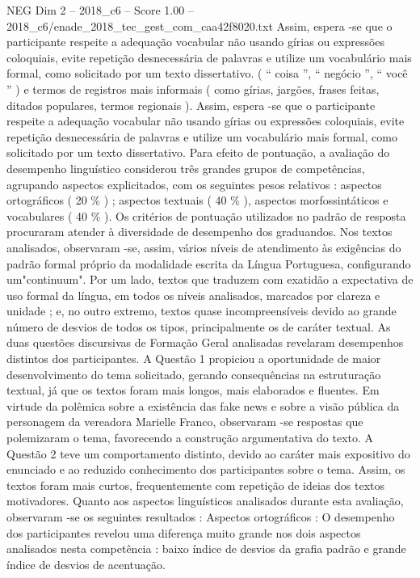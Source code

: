 \begin{textsample}{NEG Dim 2 – 2018\_c6 – Score 1.00 – 2018\_c6/enade\_2018\_tec\_gest\_com\_caa42f8020.txt}
Assim, espera -se que o participante respeite a adequação vocabular não usando gírias ou expressões coloquiais, evite repetição desnecessária de palavras e utilize um vocabulário mais formal, como solicitado por um texto dissertativo. ( “ coisa ”, “ negócio ”, “ você ” ) e termos de registros mais informais ( como gírias, jargões, frases feitas, ditados populares, termos regionais ).
Assim, espera -se que o participante respeite a adequação vocabular não usando gírias ou expressões coloquiais, evite repetição desnecessária de palavras e utilize um vocabulário mais formal, como solicitado por um texto dissertativo.
Para efeito de pontuação, a avaliação do desempenho linguístico considerou três grandes grupos de competências, agrupando aspectos explicitados, com os seguintes pesos relativos : aspectos ortográficos ( 20 \% ) ; aspectos textuais ( 40 \% ), aspectos morfossintáticos e vocabulares ( 40 \% ).
Os critérios de pontuação utilizados no padrão de resposta procuraram atender à diversidade de desempenho dos graduandos.
Nos textos analisados, observaram -se, assim, vários níveis de atendimento às exigências do padrão formal próprio da modalidade escrita da Língua Portuguesa, configurando um"continuum".
Por um lado, textos que traduzem com exatidão a expectativa de uso formal da língua, em todos os níveis analisados, marcados por clareza e unidade ; e, no outro extremo, textos quase incompreensíveis devido ao grande número de desvios de todos os tipos, principalmente os de caráter textual.
As duas questões discursivas de Formação Geral analisadas revelaram desempenhos distintos dos participantes.
A Questão 1 propiciou a oportunidade de maior desenvolvimento do tema solicitado, gerando consequências na estruturação textual, já que os textos foram mais longos, mais elaborados e fluentes.
Em virtude da polêmica sobre a existência das fake news e sobre a visão pública da personagem da vereadora Marielle Franco, observaram -se respostas que polemizaram o tema, favorecendo a construção argumentativa do texto.
A Questão 2 teve um comportamento distinto, devido ao caráter mais expositivo do enunciado e ao reduzido conhecimento dos participantes sobre o tema.
Assim, os textos foram mais curtos, frequentemente com repetição de ideias dos textos motivadores.
Quanto aos aspectos linguísticos analisados durante esta avaliação, observaram -se os seguintes resultados : Aspectos ortográficos : O desempenho dos participantes revelou uma diferença muito grande nos dois aspectos analisados nesta competência : baixo índice de desvios da grafia padrão e grande índice de desvios de acentuação.

\end{textsample}

